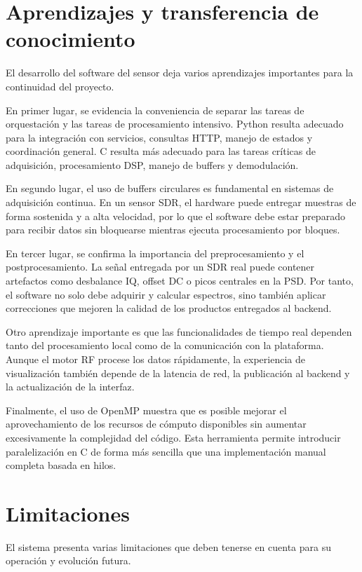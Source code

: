 \section{Aprendizajes y transferencia de conocimiento}

El desarrollo del software del sensor deja varios aprendizajes importantes para
la continuidad del proyecto.

En primer lugar, se evidencia la conveniencia de separar las tareas de
orquestación y las tareas de procesamiento intensivo. Python resulta adecuado para
la integración con servicios, consultas HTTP, manejo de estados y coordinación
general. C resulta más adecuado para las tareas críticas de adquisición,
procesamiento DSP, manejo de buffers y demodulación.

En segundo lugar, el uso de buffers circulares es fundamental en sistemas de
adquisición continua. En un sensor SDR, el hardware puede entregar muestras de
forma sostenida y a alta velocidad, por lo que el software debe estar preparado
para recibir datos sin bloquearse mientras ejecuta procesamiento por bloques.

En tercer lugar, se confirma la importancia del preprocesamiento y el
postprocesamiento. La señal entregada por un SDR real puede contener artefactos
como desbalance IQ, offset DC o picos centrales en la PSD. Por tanto, el software
no solo debe adquirir y calcular espectros, sino también aplicar correcciones que
mejoren la calidad de los productos entregados al backend.

Otro aprendizaje importante es que las funcionalidades de tiempo real dependen
tanto del procesamiento local como de la comunicación con la plataforma. Aunque el
motor RF procese los datos rápidamente, la experiencia de visualización también
depende de la latencia de red, la publicación al backend y la actualización de la
interfaz.

Finalmente, el uso de OpenMP muestra que es posible mejorar el aprovechamiento de
los recursos de cómputo disponibles sin aumentar excesivamente la complejidad del
código. Esta herramienta permite introducir paralelización en C de forma más
sencilla que una implementación manual completa basada en hilos.


\section{Limitaciones}

El sistema presenta varias limitaciones que deben tenerse en cuenta para su
operación y evolución futura.

